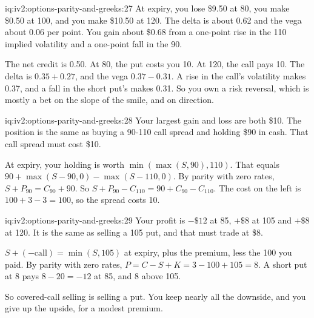 \begin{solution}{iq:iv2:options-parity-and-greeks:27}
At expiry, you lose \$9.50 at 80, you make \$0.50 at 100, and you make \$10.50 at 120. The delta is about 0.62 and the vega about 0.06 per point. You gain about \$0.68 from a one-point rise in the 110 implied volatility and a one-point fall in the 90.

The net credit is 0.50. At 80, the put costs you 10. At 120, the call pays 10. The delta is $0.35 + 0.27$, and the vega $0.37 - 0.31$. A rise in the call's volatility makes 0.37, and a fall in the short put's makes 0.31. So you own a risk reversal, which is mostly a bet on the slope of the smile, and on direction.

\end{solution}

\begin{solution}{iq:iv2:options-parity-and-greeks:28}
Your largest gain and loss are both \$10. The position is the same as buying a 90-110 call spread and holding \$90 in cash. That call spread must cost \$10.

At expiry, your holding is worth $\min(\max(S, 90), 110)$. That equals $90 + \max(S - 90, 0) - \max(S - 110, 0)$. By parity with zero rates, $S + P_{90} = C_{90} + 90$. So $S + P_{90} - C_{110} = 90 + C_{90} - C_{110}$. The cost on the left is $100 + 3 - 3 = 100$, so the spread costs 10.

\end{solution}

\begin{solution}{iq:iv2:options-parity-and-greeks:29}
Your profit is $-\$12$ at 85, $+\$8$ at 105 and $+\$8$ at 120. It is the same as selling a 105 put, and that must trade at \$8.

$S + (-\text{call}) = \min(S, 105)$ at expiry, plus the premium, less the 100 you paid. By parity with zero rates, $P = C - S + K = 3 - 100 + 105 = 8$. A short put at 8 pays $8 - 20 = -12$ at 85, and 8 above 105.

So covered-call selling is selling a put. You keep nearly all the downside, and you give up the upside, for a modest premium.

\end{solution}

